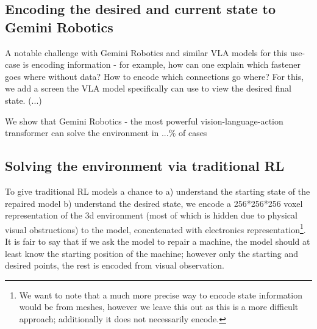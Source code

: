 \documentclass{article} %
\begin{document}
\subsection{Encoding the desired and current state to Gemini Robotics}
A notable challenge with Gemini Robotics and similar VLA models for this use-case is encoding information - for example, how can one explain which fastener goes where without data? How to encode which connections go where? For this, we add a screen the VLA model specifically can use to view the desired final state. (...)

We show that Gemini Robotics - the most powerful vision-language-action transformer can solve the environment in ...\% of cases

\subsection{Solving the environment via traditional RL}

To give traditional RL models a chance to a) understand the starting state of the repaired model b) understand the desired state, we encode a 256*256*256 voxel representation of the 3d environment (most of which is hidden due to physical visual obstructions) to the model, concatenated with electronics representation\footnote{We want to note that a much more precise way to encode state information would be from meshes, however we leave this out as this is a more difficult approach; additionally it does not necessarily encode.}. It is fair to say that if we ask the model to repair a machine, the model should at least know the starting position of the machine; however only the starting and desired points, the rest is encoded from visual observation.
\end{document}

